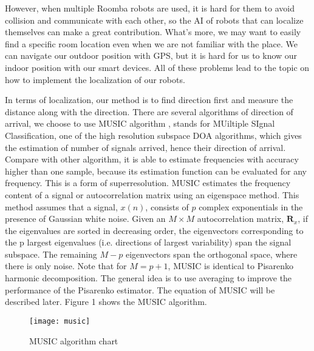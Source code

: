 	However, when multiple Roomba robots are used, it is hard for them to avoid collision and communicate with each other, so the AI of robots that can localize themselves can make a great contribution. What's more, we may want to easily find a specific room location even when we are not familiar with the place.  We can navigate our outdoor position with GPS, but it is hard for us to know our indoor position with our smart devices. All of these problems lead to the topic on how to implement the localization of our robots.
\par
	In terms of localization, our method is to find direction first and measure the distance along with the direction. There are several algorithms of direction of arrival, we choose to use MUSIC algorithm , stands for MUiltiple SIgnal Classification, one of the high resolution subspace DOA algorithms, which gives the estimation of number of signals arrived, hence their direction of arrival. Compare with other algorithm, it is able to estimate frequencies with accuracy higher than one sample, because its estimation function can be evaluated for any frequency. This is a form of superresolution. MUSIC estimates the frequency content of a signal or autocorrelation matrix using an eigenspace method. This method assumes that a signal, $x(n)$, consists of $p$ complex exponentials in the presence of Gaussian white noise. Given an $M \times M$ autocorrelation matrix, $\mathbf{R}_x$, if the eigenvalues are sorted in decreasing order, the eigenvectors corresponding to the p largest eigenvalues (i.e. directions of largest variability) span the signal subspace. The remaining $M-p$ eigenvectors span the orthogonal space, where there is only noise. Note that for $M = p + 1$, MUSIC is identical to Pisarenko harmonic decomposition. The general idea is to use averaging to improve the performance of the Pisarenko estimator. The equation of MUSIC will be described later. Figure 1 shows the MUSIC algorithm. \cite{wiki:MUSIC} \cite{music}
	\begin{figure}[ht]
	\centering
	\texttt{[image: music]}
	\caption{MUSIC algorithm chart}
	\end{figure}
	
